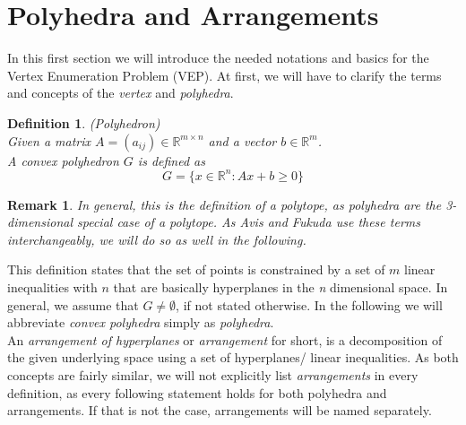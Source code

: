 \documentclass[a4paper, 11pt]{article}
\newtheorem{mydef}{Definition}
\newtheorem*{remark}{Remark}
\begin{document}
\section{Polyhedra and Arrangements}
In this first section we will introduce the needed notations and basics for the Vertex Enumeration Problem (VEP). At first, we will have to clarify the terms and concepts of the \textit{vertex} and \textit{polyhedra}.

\begin{mydef}(Polyhedron)\\
	Given a matrix $A=(a_{ij}) \in \mathbb{R}^{m\times n}$ and a vector $b \in \mathbb{R}^m$.\\
	
	A \textit{convex polyhedron} $G$ is defined as
	\begin{equation}
		G = \{ x\in \mathbb{R}^n: Ax+b\geq 0 \}
	\end{equation}
\end{mydef}
\begin{remark}
	
	In general, this is the definition of a polytope, as polyhedra are the 3-dimensional special case of a polytope. As Avis and Fukuda use these terms interchangeably, we will do so as well in the following. 
\end{remark}

This definition states that the set of points is constrained by a set of $m$ linear inequalities with $n$ that are basically hyperplanes in the \textit{n} dimensional space. In general, we assume that $G\neq\emptyset$, if not stated otherwise. In the following we will abbreviate \textit{convex polyhedra} simply as \textit{polyhedra}. \\

An \textit{arrangement of hyperplanes} or \textit{arrangement} for short, is a decomposition of the given underlying space using a set of hyperplanes/ linear inequalities. As both concepts are fairly similar, we will not explicitly list \textit{arrangements} in every definition, as every following statement holds for both polyhedra and arrangements. If that is not the case, arrangements will be named separately.\\
\end{document}

